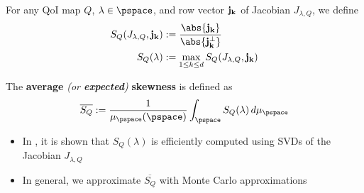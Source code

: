 \begin{frame}[t]
\begin{defn}
For any QoI map $Q$, $\lambda \in \pspace$, and row vector $\bf{j}_k$ of Jacobian $J_{\lambda, Q}$, we define
\begin{equation}
\begin{split}
S_Q(J_{\lambda,Q}, \bf{j}_k) &:= \frac{\abs{\bf{j}_k} }{\abs{\bf{j}_k^\perp}} \\
S_Q(\lambda) &:= \max_{1\leq k \leq d} S_Q(J_{\lambda,Q}, \bf{j}_k)
\end{split}
\end{equation}
\end{defn}

\begin{defn}
The \textbf{average} \emph{(or \textbf{expected})} \textbf{skewness} is defined as
\begin{equation}
\overline{S_Q} := \frac{1}{\mu_{\pspace}(\pspace)} \int_\pspace S_Q (\lambda) \, d\mu_{\pspace}
\label{eq:avgskew}
\end{equation}
\end{defn}

\begin{itemize}
	\item In \cite{BPW17}, it is shown that $S_Q(\lambda)$ is efficiently computed using SVDs of the Jacobian $J_{\lambda,Q}$
	\item In general, we approximate $\overline{S_Q}$ with Monte Carlo approximations
\end{itemize}

\end{frame}






